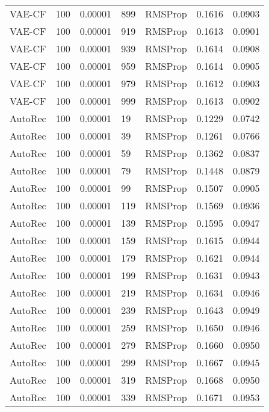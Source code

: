 \begin{tabular}{llrllrr}
  VAE-CF &  100 &  0.00001 &   899 &   RMSProp &  0.1616 &       0.0903 \\
  VAE-CF &  100 &  0.00001 &   919 &   RMSProp &  0.1613 &       0.0901 \\
  VAE-CF &  100 &  0.00001 &   939 &   RMSProp &  0.1614 &       0.0908 \\
  VAE-CF &  100 &  0.00001 &   959 &   RMSProp &  0.1614 &       0.0905 \\
  VAE-CF &  100 &  0.00001 &   979 &   RMSProp &  0.1612 &       0.0903 \\
  VAE-CF &  100 &  0.00001 &   999 &   RMSProp &  0.1613 &       0.0902 \\
 AutoRec &  100 &  0.00001 &    19 &   RMSProp &  0.1229 &       0.0742 \\
 AutoRec &  100 &  0.00001 &    39 &   RMSProp &  0.1261 &       0.0766 \\
 AutoRec &  100 &  0.00001 &    59 &   RMSProp &  0.1362 &       0.0837 \\
 AutoRec &  100 &  0.00001 &    79 &   RMSProp &  0.1448 &       0.0879 \\
 AutoRec &  100 &  0.00001 &    99 &   RMSProp &  0.1507 &       0.0905 \\
 AutoRec &  100 &  0.00001 &   119 &   RMSProp &  0.1569 &       0.0936 \\
 AutoRec &  100 &  0.00001 &   139 &   RMSProp &  0.1595 &       0.0947 \\
 AutoRec &  100 &  0.00001 &   159 &   RMSProp &  0.1615 &       0.0944 \\
 AutoRec &  100 &  0.00001 &   179 &   RMSProp &  0.1621 &       0.0944 \\
 AutoRec &  100 &  0.00001 &   199 &   RMSProp &  0.1631 &       0.0943 \\
 AutoRec &  100 &  0.00001 &   219 &   RMSProp &  0.1634 &       0.0946 \\
 AutoRec &  100 &  0.00001 &   239 &   RMSProp &  0.1643 &       0.0949 \\
 AutoRec &  100 &  0.00001 &   259 &   RMSProp &  0.1650 &       0.0946 \\
 AutoRec &  100 &  0.00001 &   279 &   RMSProp &  0.1660 &       0.0950 \\
 AutoRec &  100 &  0.00001 &   299 &   RMSProp &  0.1667 &       0.0945 \\
 AutoRec &  100 &  0.00001 &   319 &   RMSProp &  0.1668 &       0.0950 \\
 AutoRec &  100 &  0.00001 &   339 &   RMSProp &  0.1671 &       0.0953 \\

\end{tabular}
